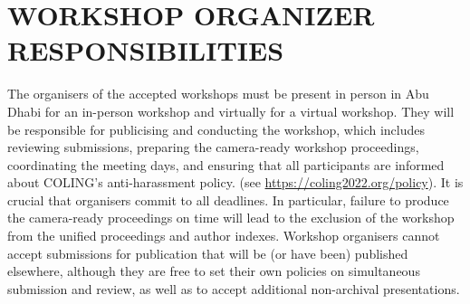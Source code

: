 \documentclass[11pt]{article}
\begin{document}
\section{WORKSHOP ORGANIZER RESPONSIBILITIES}
The organisers of the accepted workshops must be present in person in Abu Dhabi for an in-person workshop and virtually for a virtual workshop. They will be responsible for publicising and conducting the workshop, which includes reviewing submissions, preparing the camera-ready workshop proceedings, coordinating the meeting days, and ensuring that all participants are informed about COLING’s anti-harassment policy. (see \url{https://coling2022.org/policy}). It is crucial that organisers commit to all deadlines. In particular, failure to produce the camera-ready proceedings on time will lead to the exclusion of the workshop from the unified proceedings and author indexes. Workshop organisers cannot accept submissions for publication that will be (or have been) published elsewhere, although they are free to set their own policies on simultaneous submission and review, as well as to accept additional non-archival presentations.



\end{document}
